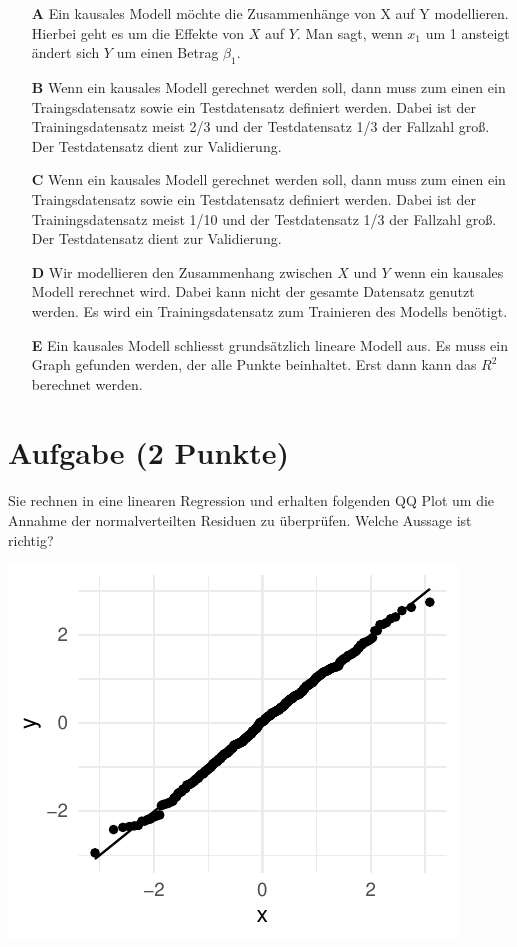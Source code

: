 \documentclass[a4paper, 9pt]{scrartcl}\usepackage[]{graphicx}\usepackage[]{xcolor}
\makeatletter
\def\maxwidth{ %
  \ifdim\Gin@nat@width>\linewidth
    \linewidth
  \else
    \Gin@nat@width
  \fi
}
\makeatother
\begin{document}
\begin{enumerate}
\item [\textbf{A} \msquare] Ein kausales Modell möchte die Zusammenhänge von X auf Y modellieren. Hierbei geht es um die Effekte von $X$ auf $Y$. Man sagt, wenn $x_1$ um 1 ansteigt ändert sich $Y$ um einen Betrag $\beta_1$.
\item [\textbf{B} \msquare] Wenn ein kausales Modell gerechnet werden soll, dann muss zum einen ein Traingsdatensatz sowie ein Testdatensatz definiert werden. Dabei ist der Trainingsdatensatz meist 2/3 und der Testdatensatz 1/3 der Fallzahl groß. Der Testdatensatz dient zur Validierung.
\item [\textbf{C} \msquare] Wenn ein kausales Modell gerechnet werden soll, dann muss zum einen ein Traingsdatensatz sowie ein Testdatensatz definiert werden. Dabei ist der Trainingsdatensatz meist 1/10 und der Testdatensatz 1/3 der Fallzahl groß. Der Testdatensatz dient zur Validierung.
\item [\textbf{D} \msquare] Wir modellieren den Zusammenhang zwischen $X$ und $Y$ wenn ein kausales Modell rerechnet wird. Dabei kann nicht der gesamte Datensatz genutzt werden. Es wird ein Trainingsdatensatz zum Trainieren des Modells benötigt.
\item [\textbf{E} \msquare] Ein kausales Modell schliesst grundsätzlich lineare Modell aus. Es muss ein Graph gefunden werden, der alle Punkte beinhaltet. Erst dann kann das $R^2$ berechnet werden.
\end{enumerate}

\section{Aufgabe \hfill (2 Punkte)}



Sie rechnen in eine linearen Regression und erhalten folgenden QQ Plot um die Annahme der normalverteilten Residuen zu überprüfen. Welche Aussage ist richtig?



{\centering \includegraphics[width=\maxwidth]{img/mc-regression-05-a-1} 

}
\end{document}
